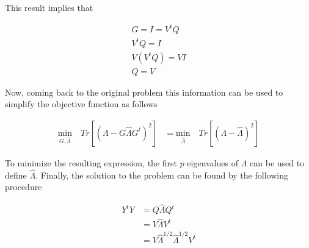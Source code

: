 \documentclass[12pt,journal]{IEEEtran}
\begin{document}
%
%
%

    This result implies that

    \begin{equation*}
        \begin{aligned}
        G = I = V^tQ\\
        V^tQ = I\\
        V(V^tQ) = VI\\
        Q = V
        \end{aligned}
    \end{equation*}

    Now, coming back to the original problem this information can be used to
    simplify the objective function as follows

    \begin{equation*}
        \begin{aligned}
            \underset{G,\hat{\Lambda}}{\text{min}} \quad Tr[(\Lambda - G \hat{\Lambda} G^t)^2]
            &=
            \underset{\hat{\Lambda}}{\text{min}} \quad Tr[(\Lambda - \hat{\Lambda})^2]
        \end{aligned}
    \end{equation*}

    To minimize the resulting expression, the first $p$ eigenvalues of $\Lambda$
    can be used to define $\hat{\Lambda}$. Finally, the solution to the
    problem can be found by the following procedure

    \begin{equation*}
        \begin{aligned}
            Y^tY &= Q \hat{\Lambda} Q^t\\
            &=
            V \hat{\Lambda} V^t\\
            &=
            V \hat{\Lambda}^{1/2} \hat{\Lambda}^{1/2} V^t\\
        \end{aligned}
    \end{equation*}
\end{document}
